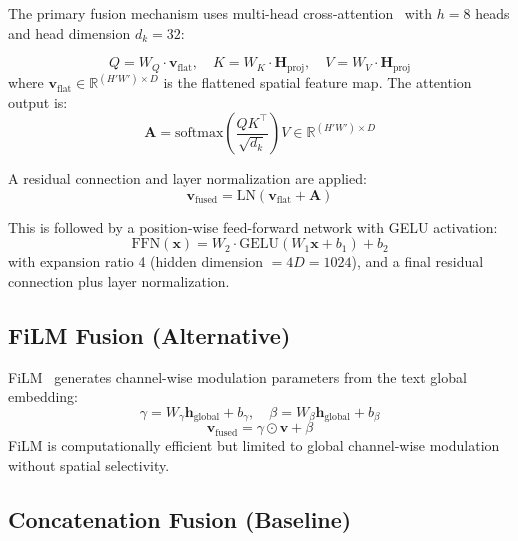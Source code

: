 The primary fusion mechanism uses multi-head cross-attention~\cite{vaswani2017attention} with $h = 8$ heads and head dimension $d_k = 32$:

\begin{equation}
	Q = W_Q \cdot \mathbf{v}_{\text{flat}}, \quad K = W_K \cdot \mathbf{H}_{\text{proj}}, \quad V = W_V \cdot \mathbf{H}_{\text{proj}}
\end{equation}
where $\mathbf{v}_{\text{flat}} \in \mathbb{R}^{(H'W') \times D}$ is the flattened spatial feature map. The attention output is:
\begin{equation}
	\mathbf{A} = \text{softmax}\left(\frac{QK^\top}{\sqrt{d_k}}\right) V \in \mathbb{R}^{(H'W') \times D}
\end{equation}

A residual connection and layer normalization are applied:
\begin{equation}
	\mathbf{v}_{\text{fused}} = \text{LN}(\mathbf{v}_{\text{flat}} + \mathbf{A})
\end{equation}

This is followed by a position-wise feed-forward network with GELU activation:
\begin{equation}
	\text{FFN}(\mathbf{x}) = W_2 \cdot \text{GELU}(W_1 \mathbf{x} + b_1) + b_2
\end{equation}
with expansion ratio 4 (hidden dimension $= 4D = 1024$), and a final residual connection plus layer normalization.

\subsection{FiLM Fusion (Alternative)}
\label{sec:approach:film}

\ac{FiLM}~\cite{perez2018film} generates channel-wise modulation parameters from the text global embedding:
\begin{equation}
	\gamma = W_\gamma \mathbf{h}_{\text{global}} + b_\gamma, \quad \beta = W_\beta \mathbf{h}_{\text{global}} + b_\beta
\end{equation}
\begin{equation}
	\mathbf{v}_{\text{fused}} = \gamma \odot \mathbf{v} + \beta
\end{equation}
FiLM is computationally efficient but limited to global channel-wise modulation without spatial selectivity.

\subsection{Concatenation Fusion (Baseline)}
\label{sec:approach:concat}

